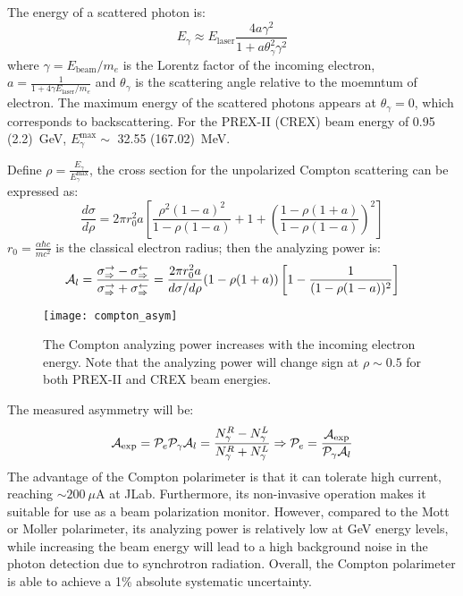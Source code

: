 The energy of a scattered photon is:
\begin{equation}
    E_\gamma \approx E_{\text{laser}} \frac{4a\gamma^2}{1 + a\theta^2_\gamma \gamma^2}
\end{equation}
where $\gamma = E_{\text{beam}}/m_e$ is the Lorentz factor of the incoming electron, 
$a = \frac{1}{1 + 4\gamma E_{\text{laser}}/m_e}$ and $\theta_\gamma$ is the scattering
angle relative to the moemntum of electron. The maximum energy of the scattered
photons appears at $\theta_\gamma = 0$, which corresponds to backscattering. 
For the PREX-II (CREX) beam energy of 0.95 (2.2)~GeV, $E_\gamma^{\text{max}} \sim$ 32.55 (167.02)~MeV.

Define $\rho = \frac{E_\gamma}{E_\gamma^{\text{max}}}$, the cross section for the unpolarized
Compton scattering can be expressed as:
\begin{equation}
    \frac{d\sigma}{d\rho} = 2\pi r_0^2 a 
    \left[ \frac{\rho^2 (1-a)^2}{1 - \rho(1-a)} + 1 + \left( \frac{1 - \rho(1+a)}{1- \rho(1-a)}\right)^2\right]
\end{equation}
$r_0 = \frac{\alpha \hbar c}{mc^2}$ is the classical electron radius; then the
analyzing power is:
\begin{equation}
    \mathcal{A}_l = \frac{\sigma^\rightarrow_\Rightarrow - \sigma^\leftarrow_\Rightarrow}
    {\sigma^\rightarrow_\Rightarrow + \sigma^\leftarrow_\Rightarrow}
    = \frac{2\pi r_0^2 a}{d\sigma/d\rho}(1 - \rho(1+a))\left[ 1 - \frac{1}{(1 - \rho(1-a))^2}\right]
\end{equation}
\begin{figure}
    \centering
    \texttt{[image: compton\_asym]}
    \caption[Compton analyzing power]
    {The Compton analyzing power increases with the incoming electron energy. 
    Note that the analyzing power will change sign at $\rho \sim 0.5$ for both PREX-II
    and CREX beam energies.}
\end{figure}

The measured asymmetry will be:
\begin{equation}
    \mathcal{A}_{\text{exp}} = \mathcal{P}_{e}\mathcal{P}_{\gamma}\mathcal{A}_{l} = \frac{N_{\gamma}^R - N_{\gamma}^L}{N_{\gamma}^R + N_{\gamma}^L}
    \Rightarrow
    \mathcal{P}_e = \frac{\mathcal{A}_{\text{exp}}}{\mathcal{P}_{\gamma}\mathcal{A}_{l}}
\end{equation}
The advantage of the Compton polarimeter is that it can tolerate high current,
reaching $\sim 200 \ \mu$A at JLab. Furthermore, its non-invasive operation makes it suitable for use as a beam polarization monitor.
However, compared to the Mott or Moller polarimeter,
its analyzing power is relatively low at GeV energy levels, while increasing the beam
energy will lead to a high background noise in the photon detection due to synchrotron 
radiation. Overall, the Compton polarimeter is able to achieve a 1\% absolute systematic
uncertainty.

